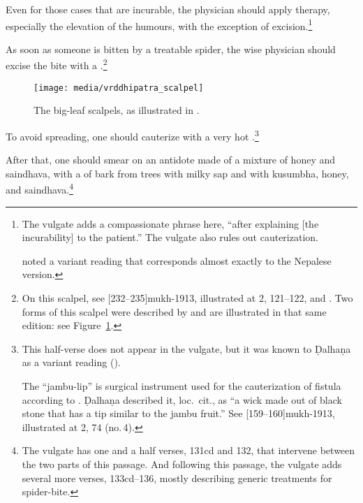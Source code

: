\begin{translation}
\item [128]

Even for those cases that are incurable, the physician should apply
therapy, especially the elevation of the humours, with the exception
of excision.\footnote{The vulgate adds a compassionate phrase here,
    “after explaining [the incurability] to the patient.”  The vulgate
    also rules out cauterization.
    
     noted a variant reading  that corresponds almost exactly to the Nepalese version.}

\item [129]

As soon as someone is bitten by a treatable spider, the wise physician
should excise the bite with a .\footnote{On this scalpel, see
    [232--235]{mukh-1913}, illustrated at 2, 121--122, and
    \cite[83--84]{wuja-2003}. Two forms of this scalpel were described by
     and are illustrated in that same edition: see
    Figure~\ref{fig:vrddhipatrascalpel}.}
\begin{figure}
    \centering
    \texttt{[image: media/vrddhipatra\_scalpel]}
    \caption{The big-leaf scalpels, as illustrated in \cite[36]{vulgate}.}
    \label{fig:vrddhipatrascalpel}
\end{figure}

\item[129 add 1]

To avoid spreading, one should cauterize with a very hot
.\footnote{This half-verse does not appear
    in the vulgate, but it was known to Ḍalhaṇa as a variant reading
    ().
    
    The “jambu-lip” is surgical instrument used for the
cauterization of fistula according to .  Ḍalhaṇa
described it, loc.\ cit., as  “a wick made out of black stone that
has a tip similar to the jambu fruit.”  See
[159--160]{mukh-1913}, illustrated at 2, 74 (no.\,4).}

\item[131ab, 133ab]

After that, one should smear on an antidote made of a mixture of honey and 
\gls{saindhava}, with a  of bark from trees with milky 
sap and with 
\gls{kusumbha}, 
honey, and
\gls{saindhava}.\footnote{The vulgate has one and a half verses, 131cd and 
132, that intervene between the two parts of this passage.  And following this 
passage, the vulgate adds several more verses, 133cd--136, mostly describing 
generic treatments for spider-bite.}



\end{translation}
